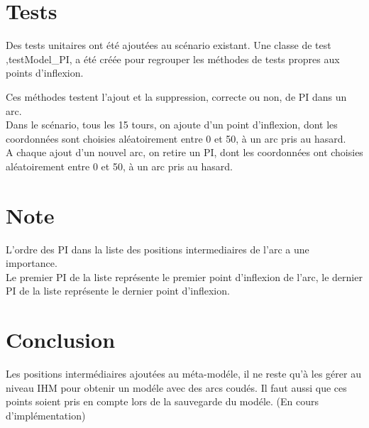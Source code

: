 \documentclass{article}
\begin{document}
\section{Tests}

Des tests unitaires ont \'et\'e ajout\'ees au sc\'enario existant.
Une classe de test ,testModel\_PI, a \'et\'e cr\'e\'ee pour regrouper les m\'ethodes de tests propres aux points d'inflexion.

Ces m\'ethodes testent l'ajout et la suppression, correcte ou non, de PI dans un arc.\\

Dans le sc\'enario, tous les 15 tours, on ajoute d'un point d'inflexion, dont les coordonn\'ees sont choisies al\'eatoirement entre 0 et 50, \`a un arc pris au hasard.\\

A chaque ajout d'un nouvel arc, on retire un PI, dont les coordonn\'ees ont choisies al\'eatoirement entre 0  et 50, \`a un arc pris au hasard.

\section{Note}

L'ordre des PI dans la liste des positions intermediaires de l'arc a une importance.\\

Le premier PI de la liste repr\'esente le premier point d'inflexion de l'arc, le dernier PI de la liste repr\'esente le dernier point d'inflexion.

\section{Conclusion}

Les positions interm\'ediaires ajout\'ees au m\'eta-mod\'ele, il ne reste qu'\`a les g\'erer au niveau IHM pour obtenir un mod\'ele avec des arcs coud\'es.
Il faut aussi que ces points soient pris en compte lors de la sauvegarde du mod\'ele.
(En cours d'impl\'ementation)
\end{document}
